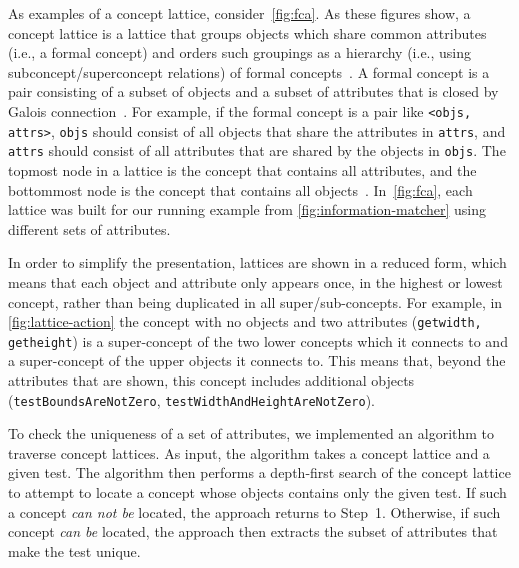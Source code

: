 As examples of a concept lattice, consider~\cref{fig:fca}.
% 
As these figures show, a concept lattice is a lattice that groups objects which share common attributes (i.e., a formal concept) and orders such groupings as a hierarchy (i.e., using subconcept\slash superconcept relations) of formal concepts~\cite{tonella2003using}.
%
A formal concept is a pair consisting of a subset of objects and a subset of attributes that is closed by Galois connection~\cite{singh2014note}.
%
For example, if the formal concept is a pair like \texttt{<objs, attrs>}, \texttt{objs} should consist of all objects that share the attributes in \texttt{attrs}, and \texttt{attrs} should consist of all attributes that are shared by the objects in \texttt{objs}.
%
The topmost node in a lattice is the concept that contains all attributes, and the bottommost node is the concept that contains all objects~\cite{atif2013mathematical}.
% 
In~\cref{fig:fca}, each lattice was built for our running example from \cref{fig:information-matcher} using different sets of attributes.


In order to simplify the presentation, lattices are shown in a reduced form, which means that each object and attribute only appears once, in the highest or lowest concept, rather than being duplicated in all super\slash sub-concepts.
%
For example, in \cref{fig:lattice-action} the concept with no objects and two attributes (\texttt{getwidth, getheight}) is a super-concept of the two lower concepts which it connects to and a super-concept of the upper objects it connects to.
%
This means that, beyond the attributes that are shown, this concept includes additional objects (\texttt{test\-Bounds\-Are\-Not\-Zero}, \texttt{test\-Width\-And\-Height\-Are\-Not\-Zero}).


To check the uniqueness of a set of attributes, we implemented an algorithm to traverse concept lattices.
%
As input, the algorithm takes a concept lattice and a given test.
% 
The algorithm then performs a depth-first search of the concept lattice to attempt to locate a concept whose objects contains only the given test.
%
If such a concept \emph{can not be} located, the approach returns to Step~1.
%
Otherwise, if such concept \emph{can be} located, the approach then extracts the subset of attributes that make the test unique.


